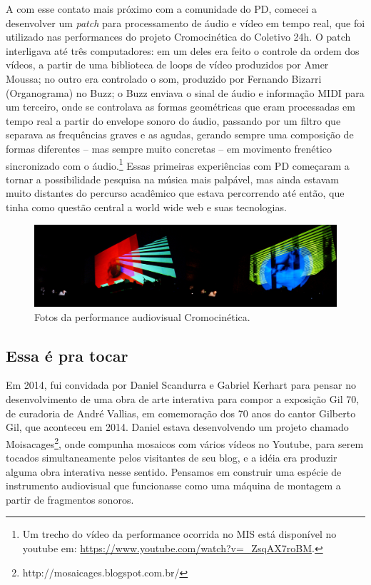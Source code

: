 A com esse contato mais próximo com a comunidade do PD, comecei a desenvolver um \emph{patch} para processamento de áudio e vídeo em tempo real, que foi utilizado nas performances do projeto Cromocinética do Coletivo 24h. O patch interligava até três computadores: em um deles era feito o controle da ordem dos vídeos, a partir de uma biblioteca de loops de vídeo produzidos por Amer Moussa; no outro era controlado o som, produzido por Fernando Bizarri (Organograma) no Buzz; o Buzz enviava o sinal de áudio e informação MIDI para um terceiro, onde se controlava as formas geométricas que eram processadas em tempo real a partir do envelope sonoro do áudio, passando por um filtro que separava as frequências graves e as agudas, gerando sempre uma composição de formas diferentes – mas sempre muito concretas – em movimento frenético sincronizado com o áudio.\footnote{Um trecho do vídeo da performance ocorrida no MIS está disponível no youtube em:  \url{https://www.youtube.com/watch?v=_ZsqAX7roBM}.} Essas primeiras experiências com PD começaram a tornar a possibilidade pesquisa na música mais palpável, mas ainda estavam muito distantes do percurso acadêmico que estava percorrendo até então, que tinha como questão central a world wide web e suas tecnologias.


\begin{figure}

\includegraphics[width=1\textwidth]{pictures/cap1/cromocinetica}
\caption{Fotos da performance audiovisual Cromocinética.}
\label{fig:cromocinetica}
\end{figure}


\subsection{Essa é pra tocar}
Em 2014, fui convidada por Daniel Scandurra e Gabriel Kerhart para pensar no desenvolvimento de uma obra de arte interativa para compor a exposição Gil 70, de curadoria de André Vallias, em comemoração dos 70 anos do cantor Gilberto Gil, que aconteceu em 2014. Daniel estava desenvolvendo um projeto chamado Moisacages\footnote{http://mosaicages.blogspot.com.br/}, onde compunha mosaicos com vários vídeos no Youtube, para serem tocados simultaneamente pelos visitantes de seu blog, e a idéia era produzir alguma obra interativa nesse sentido. Pensamos em construir uma espécie de instrumento audiovisual que funcionasse como uma máquina de montagem a partir de fragmentos sonoros.

